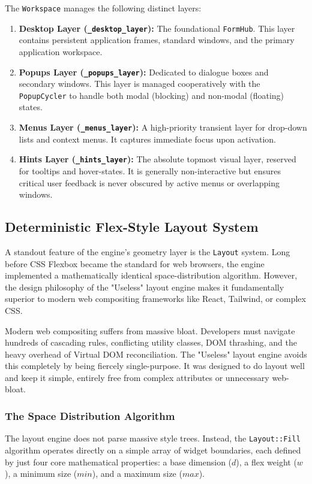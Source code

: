 \documentclass[11pt, a4paper]{article}
\begin{document}
The \texttt{Workspace} manages the following distinct layers:
\begin{enumerate}
    \item \textbf{Desktop Layer (\texttt{\_desktop\_layer}):} The foundational \texttt{FormHub}. This layer contains persistent application frames, standard windows, and the primary application workspace. 
    \item \textbf{Popups Layer (\texttt{\_popups\_layer}):} Dedicated to dialogue boxes and secondary windows. This layer is managed cooperatively with the \texttt{PopupCycler} to handle both modal (blocking) and non-modal (floating) states.
    \item \textbf{Menus Layer (\texttt{\_menus\_layer}):} A high-priority transient layer for drop-down lists and context menus. It captures immediate focus upon activation.
    \item \textbf{Hints Layer (\texttt{\_hints\_layer}):} The absolute topmost visual layer, reserved for tooltips and hover-states. It is generally non-interactive but ensures critical user feedback is never obscured by active menus or overlapping windows.
\end{enumerate}

\subsection{Deterministic Flex-Style Layout System}
A standout feature of the engine's geometry layer is the \texttt{Layout} system. Long before CSS Flexbox became the standard for web browsers, the engine implemented a mathematically identical space-distribution algorithm. However, the design philosophy of the "Useless" layout engine makes it fundamentally superior to modern web compositing frameworks like React, Tailwind, or complex CSS.

Modern web compositing suffers from massive bloat. Developers must navigate hundreds of cascading rules, conflicting utility classes, DOM thrashing, and the heavy overhead of Virtual DOM reconciliation. The "Useless" layout engine avoids this completely by being fiercely single-purpose. It was designed to do layout well and keep it simple, entirely free from complex attributes or unnecessary web-bloat. 

\subsubsection{The Space Distribution Algorithm}
The layout engine does not parse massive style trees. Instead, the \texttt{Layout::Fill} algorithm operates directly on a simple array of widget boundaries, each defined by just four core mathematical properties: a base dimension ($d$), a flex weight ($w$), a minimum size ($min$), and a maximum size ($max$).
\end{document}
